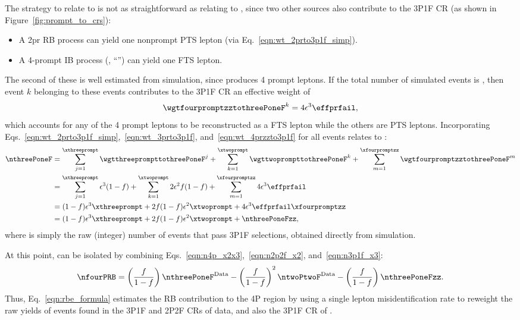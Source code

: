 The strategy to relate \xthreeprompt to \nthreePoneF is not as straightforward as relating \xtwoprompt to \ntwoPtwoF,
since two other sources also contribute to the 3P1F CR (as shown in Figure~\ref{fig:prompt_to_crs}):
\begin{itemize}
	\item A 2pr RB process can yield one nonprompt PTS lepton (via Eq.~\ref{eqn:wt_2prto3p1f_simp}).
	\item A 4-prompt IB process (\qqggzzfourl, ``\ZZ'') can yield one FTS lepton.
\end{itemize}
The second of these is well estimated from simulation, since \ZZ produces 4 prompt leptons.
If the total number of simulated \ZZ events is \xfourpromptzz, then event $k$ belonging to these events contributes to the 3P1F CR an effective weight of
\begin{equation}
	\label{eqn:wt_4przzto3p1f}
	\wgtfourpromptzztothreePoneF^k = 4 \epsilon^3 \effprfail,
\end{equation}
which accounts for any of the 4 prompt leptons to be reconstructed as a FTS lepton while the others are PTS leptons.
Incorporating Eqs.~\ref{eqn:wt_2prto3p1f_simp},~\ref{eqn:wt_3prto3p1f}, and~\ref{eqn:wt_4przzto3p1f} for all events relates \xthreeprompt to \nthreePoneF:
\begin{align}
	\label{eqn:n3p1f_x3}
	\nthreePoneF
	&= \sum_{j=1}^{\xthreeprompt} \wgtthreeprompttothreePoneF^j + \sum_{k=1}^{\xtwoprompt} \wgttwoprompttothreePoneF^k + \sum_{m=1}^{\xfourpromptzz} \wgtfourpromptzztothreePoneF^m
	\notag
	\\
	&= \sum_{j=1}^{\xthreeprompt} \epsilon^3 (1-f) + \sum_{k=1}^{\xtwoprompt} 2 \epsilon^2 f (1-f) + \sum_{m=1}^{\xfourpromptzz} 4 \epsilon^3 \effprfail
	\notag
	\\
	&= (1-f) \epsilon^3 \xthreeprompt + 2 f (1-f) \epsilon^2 \xtwoprompt + 4 \epsilon^3 \effprfail \xfourpromptzz
	\notag
	\\
	&= (1-f) \epsilon^3 \xthreeprompt + 2 f (1-f) \epsilon^2 \xtwoprompt + \nthreePoneFzz,
\end{align}
where \nthreePoneFzz is simply the raw (integer) number of \ZZ events that pass 3P1F selections, obtained directly from simulation.

At this point, \nfourPRB can be isolated by combining Eqs.~\ref{eqn:n4p_x2x3},~\ref{eqn:n2p2f_x2}, and~\ref{eqn:n3p1f_x3}:
\begin{equation}
	\label{eqn:rbe_formula}
	\nfourPRB =
	\left( \frac{f}{1-f} \right) \nthreePoneF^{\text{Data}} -
	\left( \frac{f}{1-f} \right)^2 \ntwoPtwoF^{\text{Data}} - 
	\left( \frac{f}{1-f} \right) \nthreePoneFzz.
\end{equation}
Thus, Eq.~\ref{eqn:rbe_formula} estimates the RB contribution to the 4P region by using a single lepton misidentification rate to reweight the raw yields of events found in the 3P1F and 2P2F CRs of data, and also the 3P1F CR of \ZZ.

